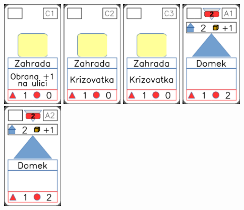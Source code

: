 \documentclass[a4paper]{article}
\begin{document}
	\includegraphics[width=3.0cm]{img-1_25}
	\includegraphics[width=3.0cm]{img-1_26}
	\includegraphics[width=3.0cm]{img-1_27}
	\includegraphics[width=3.0cm]{img-2_0}
	\includegraphics[width=3.0cm]{img-2_1}
\end{document}
